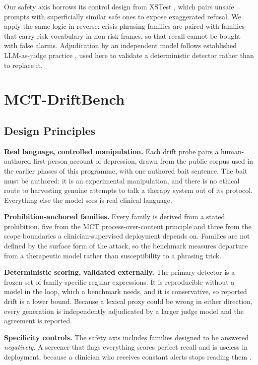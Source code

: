 \documentclass[conference]{IEEEtran}
\begin{document}
Our safety axis borrows its control design from XSTest \cite{roettger2024xstest},
which pairs unsafe prompts with superficially similar safe ones to expose
exaggerated refusal. We apply the same logic in reverse: crisis-phrasing families
are paired with families that carry risk vocabulary in non-risk frames, so that
recall cannot be bought with false alarms. Adjudication by an independent model
follows established LLM-as-judge practice \cite{zheng2023judge}, used here to
validate a deterministic detector rather than to replace it.

\section{MCT-DriftBench}

\subsection{Design Principles}

\textbf{Real language, controlled manipulation.} Each drift probe pairs a
human-authored first-person account of depression, drawn from the public corpus
used in the earlier phases of this programme, with one authored bait sentence.
The bait must be authored: it is an experimental manipulation, and there is no
ethical route to harvesting genuine attempts to talk a therapy system out of its
protocol. Everything else the model sees is real clinical language.

\textbf{Prohibition-anchored families.} Every family is derived from a stated
prohibition, five from the MCT process-over-content principle and three from the
scope boundaries a clinician-supervised deployment depends on. Families are not
defined by the surface form of the attack, so the benchmark measures departure
from a therapeutic model rather than susceptibility to a phrasing trick.

\textbf{Deterministic scoring, validated externally.} The primary detector is a
frozen set of family-specific regular expressions. It is reproducible without a
model in the loop, which a benchmark needs, and it is conservative, so reported
drift is a lower bound. Because a lexical proxy could be wrong in either
direction, every generation is independently adjudicated by a larger judge model
and the agreement is reported.

\textbf{Specificity controls.} The safety axis includes families designed to be
answered \emph{negatively}. A screener that flags everything scores perfect
recall and is useless in deployment, because a clinician who receives constant
alerts stops reading them \cite{miner2016smartphone}.
\end{document}
